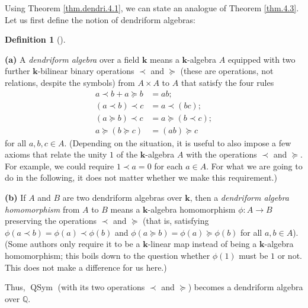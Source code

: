 \documentclass[numbers=enddot,12pt,final,onecolumn,notitlepage]{scrartcl}%
\theoremstyle{definition}
\newtheorem{defi}[theo]{Definition}
\newenvironment{definition}[1][]
{\begin{defi}[#1]\begin{leftbar}}
{\end{leftbar}\end{defi}}
\newenvironment{verlong}{}{}
\begin{document}
\begin{verlong}
Using Theorem \ref{thm.dendri.4.1}, we can state an analogue of Theorem
\ref{thm.4.3}. Let us first define the notion of dendriform algebras:

\begin{definition}
\textbf{(a)} A \textit{dendriform algebra} over a field $\mathbf{k}$ means a
$\mathbf{k}$-algebra $A$ equipped with two further $\mathbf{k}$-bilinear
binary operations $\left.  \prec\right.  $ and $\left.  \succeq\right.  $
(these are operations, not relations, despite the symbols) from $A\times A$ to
$A$ that satisfy the four rules%
\begin{align*}
a\left.  \prec\right.  b+a\left.  \succeq\right.  b  &  =ab;\\
\left(  a\left.  \prec\right.  b\right)  \left.  \prec\right.  c  &  =a\left.
\prec\right.  \left(  bc\right)  ;\\
\left(  a\left.  \succeq\right.  b\right)  \left.  \prec\right.  c  &
=a\left.  \succeq\right.  \left(  b\left.  \prec\right.  c\right)  ;\\
a\left.  \succeq\right.  \left(  b\left.  \succeq\right.  c\right)   &
=\left(  ab\right)  \left.  \succeq\right.  c
\end{align*}
for all $a,b,c\in A$. (Depending on the situation, it is useful to also impose
a few axioms that relate the unity $1$ of the $\mathbf{k}$-algebra $A$ with
the operations $\left.  \prec\right.  $ and $\left.  \succeq\right.  $. For
example, we could require $1\left.  \prec\right.  a=0$ for each $a\in A$. For
what we are going to do in the following, it does not matter whether we make
this requirement.)

\textbf{(b)} If $A$ and $B$ are two dendriform algebras over $\mathbf{k}$,
then a \textit{dendriform algebra homomorphism} from $A$ to $B$ means a
$\mathbf{k}$-algebra homomorphism $\phi:A\rightarrow B$ preserving the
operations $\left.  \prec\right.  $ and $\left.  \succeq\right.  $ (that is,
satisfying $\phi\left(  a\left.  \prec\right.  b\right)  =\phi\left(
a\right)  \left.  \prec\right.  \phi\left(  b\right)  $ and $\phi\left(
a\left.  \succeq\right.  b\right)  =\phi\left(  a\right)  \left.
\succeq\right.  \phi\left(  b\right)  $ for all $a,b\in A$). (Some authors
only require it to be a $\mathbf{k}$-linear map instead of being a
$\mathbf{k}$-algebra homomorphism; this boils down to the question whether
$\phi\left(  1\right)  $ must be $1$ or not. This does not make a difference
for us here.)
\end{definition}

Thus, $\operatorname*{QSym}$ (with its two operations $\left.  \prec\right.  $
and $\left.  \succeq\right.  $) becomes a dendriform algebra over $\mathbb{Q}$.


\end{verlong}
\end{document}
